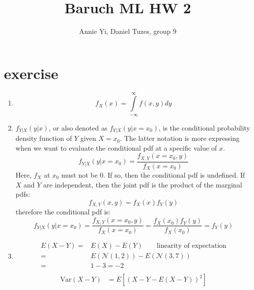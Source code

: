 \documentclass{article}
\title{Baruch ML HW 2}
\author{Annie Yi, Daniel Tuzes, group 9}
\begin{document}
\maketitle
\section{exercise}
\begin{enumerate}[label=\alph*)]
    \item \[{f_X}\left( x \right) = \int\limits_{ - \infty }^\infty  {f\left( {x,y} \right)dy} \]
    \item ${f_{Y|X}}\left( {y|x} \right)$,
          or also denoted as ${f_{Y|X}}\left( y|x=x_0 \right)$,
          is the conditional probability density function of $Y$ given $X=x_0$.
          The latter notation is more expressing
          when we want to evaluate the conditional pdf
          at a specific value of $x$.
          \[{f_{Y|X}}\left( {y|x = {x_0}} \right) = \frac{{{f_{X,Y}}\left( {x = {x_0},y} \right)}}{{{f_X}\left( {x = {x_0}} \right)}}\]
          Here, $f_X$ at $x_0$ must not be 0. If so, then the conditional pdf is undefined.
          If $X$ and $Y$ are independent,
          then the joint pdf is the product of the marginal pdfs:
          \[{f_{X,Y}}\left( {x,y} \right) = {f_X}\left( x \right){f_Y}\left( y \right)\]
          therefore the conditional pdf is:
          \[{f_{Y|X}}\left( {y|x = {x_0}} \right) = \frac{{{f_{X,Y}}\left( {x = {x_0},y} \right)}}{{{f_X}\left( {x = {x_0}} \right)}} = \frac{{{f_X}\left( x_0 \right){f_Y}\left( y \right)}}{{{f_X}\left( x_0 \right)}} = {f_Y}\left( y \right)\]
    \item \[\begin{aligned}
                  E\left( {X - Y} \right) = & E\left( X \right) - E\left( Y \right)\qquad {\text{linearity of expectation}}                           \\
                  =                         & E\left( {\mathcal{N}}\left( {1,2} \right) \right) - E\left( {{\mathcal{N}}\left( {3,7} \right)} \right) \\
                  =                         & 1 - 3 =  - 2                                                                                            \\
              \end{aligned} \]
          \[
              \begin{aligned}
                  \mathrm{Var}(X - Y) & = {E}\left[(X - Y - {E}(X - Y))^2\right]                                       \\

\end{aligned}\]
\end{enumerate}
\end{document}
